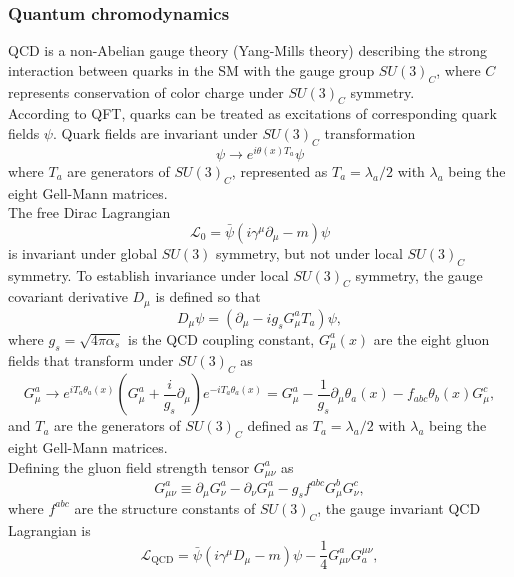 \documentclass[../thesis.tex]{subfiles}
\begin{document}
\subsubsection*{Quantum chromodynamics}
\acs{QCD} is a non-Abelian gauge theory (Yang-Mills theory) describing the strong interaction between quarks in the \acs{SM} with the gauge group $SU(3)_C$, where $C$ represents conservation of color charge under $SU(3)_C$ symmetry.\\
According to QFT, quarks can be treated as excitations of corresponding quark fields $\psi$.
Quark fields are invariant under $SU(3)_C$ transformation
\begin{equation}
\psi \rightarrow e^{i\theta(x)T_a} \psi
\end{equation}
where $T_a$ are generators of $SU(3)_C$, represented as $T_a=\lambda_a/2$ with $\lambda_a$ being the eight Gell-Mann matrices.\\
The free Dirac Lagrangian
\begin{equation}
\mathcal{L}_0=\bar{\psi}(i\gamma^\mu\partial_\mu-m)\psi
\end{equation}
is invariant under global $SU(3)$ symmetry, but not under local $SU(3)_C$ symmetry.
To establish invariance under local $SU(3)_C$ symmetry, the gauge covariant derivative $D_\mu$ is defined so that
\begin{equation}
D_\mu \psi = (\partial_\mu-ig_sG^a_\mu T_a)\psi,
\end{equation}
where $g_s=\sqrt{4\pi\alpha_s}$ is the \acs{QCD} coupling constant, $G^a_\mu(x)$ are the eight gluon fields that transform under $SU(3)_C$ as
\begin{equation}
G_\mu^a \rightarrow e^{iT_a\theta_a(x)}\left( G_\mu^a+\frac{i}{g_s}\partial_\mu \right)e^{-iT_a\theta_a(x)}
=G_\mu^a - \frac{1}{g_s}\partial_\mu\theta_a(x)-f_{abc}\theta_b(x)G_\mu^c,
\end{equation} 
and $T_a$ are the generators of $SU(3)_C$ defined as $T_a=\lambda_a/2$ with $\lambda_a$ being the eight Gell-Mann matrices.\\
Defining the gluon field strength tensor $G^a_{\mu \nu}$ as
\begin{equation}
G_{\mu \nu}^a \equiv \partial_\mu G^a_\nu - \partial_\nu G^a_\mu - g_s f^{abc} G^b_\mu G^c_\nu,
\end{equation}
where $f^{abc}$ are the structure constants of $SU(3)_C$, the gauge invariant \acs{QCD} Lagrangian is
\begin{equation}
\mathcal{L}_\text{QCD}=\bar{\psi}(i\gamma^\mu D_\mu-m)\psi - \frac{1}{4} G_{\mu \nu}^a G_a^{\mu \nu},
\end{equation}
\end{document}
